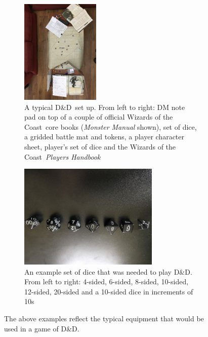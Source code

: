 \documentclass[final]{cmpreport}
\newcommand{\WotC}{Wizards of the Coast}
\newcommand{\dnd}{D\&D}
\begin{document}
			\begin{figure}[h] 
				\begin{subfigure}{0.5\textwidth}
					\includegraphics[width=\linewidth, height=5cm, angle=180]{DnD_Live.jpg}
					\caption{A typical \dnd \ set up. From left to right: DM note pad on top of a couple of official \WotC \ core books (\emph{Monster Manual} shown), set of dice, a gridded battle mat and tokens, a player character sheet, player's set of dice and the \WotC \ \emph{Players Handbook}} \label{fig:DnDLive}
				\end{subfigure}
				\begin{subfigure}{0.5\textwidth}
					\includegraphics[width=\linewidth, height=5cm, angle=180]{DnD_Dice.jpg}
					\caption{An example set of dice that was needed to play \dnd. From left to right: 4-sided, 6-sided, 8-sided, 10-sided, 12-sided, 20-sided and a 10-sided dice in increments of 10s} \label{fig:DnDDice}
				\end{subfigure}
				\caption{The above examples reflect the typical equipment that would be used in a game of \dnd.} \label{fig:dnd-equipment}
			\end{figure}
			
\end{document}
